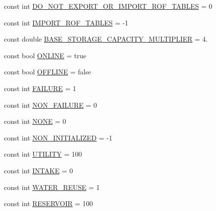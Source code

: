 \begin{DoxyCompactItemize}
const int \mbox{\hyperlink{namespaceConstants_a8237ceba4a3f169b0a547b6a6d794955_a8237ceba4a3f169b0a547b6a6d794955}{D\+O\+\_\+\+N\+O\+T\+\_\+\+E\+X\+P\+O\+R\+T\+\_\+\+O\+R\+\_\+\+I\+M\+P\+O\+R\+T\+\_\+\+R\+O\+F\+\_\+\+T\+A\+B\+L\+ES}} = 0
\item 
const int \mbox{\hyperlink{namespaceConstants_aa64d03395b183f56f6f79d0701324ad1_aa64d03395b183f56f6f79d0701324ad1}{I\+M\+P\+O\+R\+T\+\_\+\+R\+O\+F\+\_\+\+T\+A\+B\+L\+ES}} = -\/1
\item 
const double \mbox{\hyperlink{namespaceConstants_a057a0def6be60913ea568f5aa9d05ef2_a057a0def6be60913ea568f5aa9d05ef2}{B\+A\+S\+E\+\_\+\+S\+T\+O\+R\+A\+G\+E\+\_\+\+C\+A\+P\+A\+C\+I\+T\+Y\+\_\+\+M\+U\+L\+T\+I\+P\+L\+I\+ER}} = 4.
\item 
const bool \mbox{\hyperlink{namespaceConstants_a478993fe9b060f100867f2645bdc0baa_a478993fe9b060f100867f2645bdc0baa}{O\+N\+L\+I\+NE}} = true
\item 
const bool \mbox{\hyperlink{namespaceConstants_a1e15aca4aeb3be807e35675fc09af563_a1e15aca4aeb3be807e35675fc09af563}{O\+F\+F\+L\+I\+NE}} = false
\item 
const int \mbox{\hyperlink{namespaceConstants_ad5c946a1cf9d445d7753d3f30a39bf6e_ad5c946a1cf9d445d7753d3f30a39bf6e}{F\+A\+I\+L\+U\+RE}} = 1
\item 
const int \mbox{\hyperlink{namespaceConstants_a0595423b130c1645b173272f50338ed9_a0595423b130c1645b173272f50338ed9}{N\+O\+N\+\_\+\+F\+A\+I\+L\+U\+RE}} = 0
\item 
const int \mbox{\hyperlink{namespaceConstants_a79ee092c4ca31cde9669f70d505eeca5_a79ee092c4ca31cde9669f70d505eeca5}{N\+O\+NE}} = 0
\item 
const int \mbox{\hyperlink{namespaceConstants_a8e8b0a537619c378d03117c5ed1c3ea1_a8e8b0a537619c378d03117c5ed1c3ea1}{N\+O\+N\+\_\+\+I\+N\+I\+T\+I\+A\+L\+I\+Z\+ED}} = -\/1
\item 
const int \mbox{\hyperlink{namespaceConstants_a5ea4764afe0d01f0a38edfd66e806710_a5ea4764afe0d01f0a38edfd66e806710}{U\+T\+I\+L\+I\+TY}} = 100
\item 
const int \mbox{\hyperlink{namespaceConstants_adb591bf3b5663c16cf71d3cbb044c3b3_adb591bf3b5663c16cf71d3cbb044c3b3}{I\+N\+T\+A\+KE}} = 0
\item 
const int \mbox{\hyperlink{namespaceConstants_aebb21b9413741e893ea6a79e379e9ec6_aebb21b9413741e893ea6a79e379e9ec6}{W\+A\+T\+E\+R\+\_\+\+R\+E\+U\+SE}} = 1
\item 
const int \mbox{\hyperlink{namespaceConstants_a127d57d404f178c91f8ed88823e24088_a127d57d404f178c91f8ed88823e24088}{R\+E\+S\+E\+R\+V\+O\+IR}} = 100

\end{DoxyCompactItemize}
